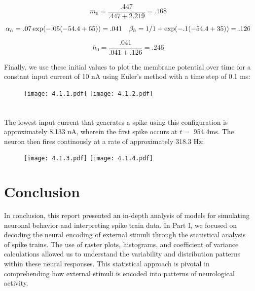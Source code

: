 \documentclass{article}
\begin{document}
\begin{equation}
    m_0 = \frac{.447}{.447 + 2.219} = .168
\end{equation}

\begin{equation}
    \alpha_h = .07 \exp(-.05(-54.4 + 65)) = .041 \\ 
    \quad \quad \\
    \beta_h = 1 / 1 + \exp(-.1(-54.4 + 35)) = .126
\end{equation}

\begin{equation}
    h_0 = \frac{.041}{.041 + .126} = .246
\end{equation}
\vspace{6px}

\newpage
Finally, we use these initial values to plot the membrane potential over time for a constant input current of 10 nA using Euler's method with a time step of 0.1 ms:

\begin{figure}[ht]
    \centering
    \texttt{[image: 4.1.1.pdf]}
    \texttt{[image: 4.1.2.pdf]}
\end{figure}
\vspace{-20px}



\section{}
The lowest input current that generates a spike using this configuration is approximately 8.133 nA, wherein the first spike occurs at $t =$ 954.4ms. The neuron then fires continously at a rate of approximately 318.3 Hz:

\begin{figure}[ht]
    \centering
    \texttt{[image: 4.1.3.pdf]}
    \texttt{[image: 4.1.4.pdf]}
\end{figure}





\newpage
\section*{Conclusion}
In conclusion, this report presented an in-depth analysis of models for simulating neuronal behavior and interpreting spike train data. In Part I, we focused on decoding the neural encoding of external stimuli through the statistical analysis of spike trains. The use of raster plots, histograms, and coefficient of variance calculations allowed us to understand the variability and distribution patterns within these neural responses. This statistical approach is pivotal in comprehending how external stimuli is encoded into  patterns of neurological activity.
\vspace{8px}
\end{document}
